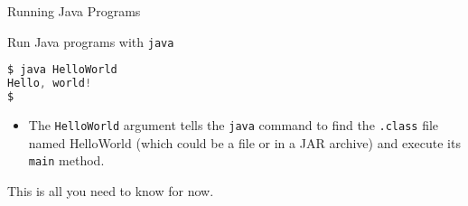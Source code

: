 \documentclass{beamer}
\begin{document}
\begin{frame}[fragile]{Running Java Programs}


Run Java programs with {\tt java}
\begin{lstlisting}[language=Java]
$ java HelloWorld
Hello, world!
$
\end{lstlisting}
\begin{itemize}
\item The {\tt HelloWorld} argument tells the {\tt java} command to find the {\tt .class} file named HelloWorld (which could be a file or in a JAR archive) and execute its {\tt main} method.
\end{itemize}
This is all you need to know for now.
\end{frame}







\end{document}
